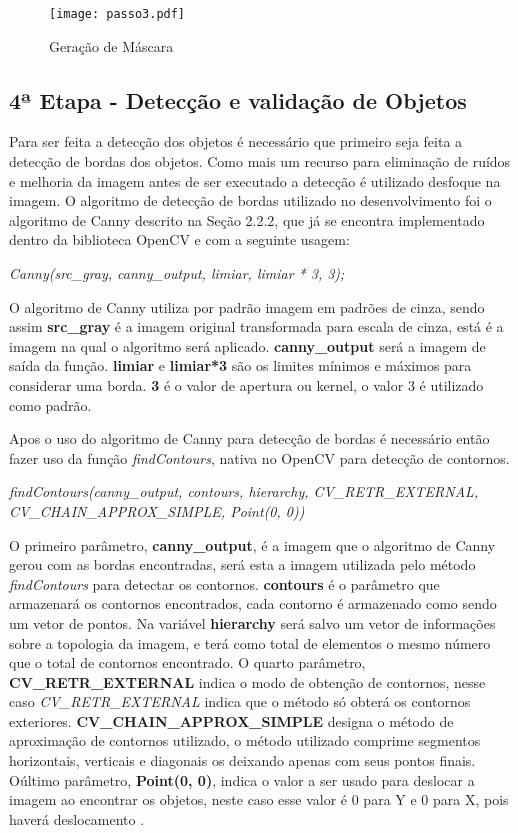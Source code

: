 \begin{figure}[H]
			\centering
			\texttt{[image: passo3.pdf]}
			\caption{Geração de Máscara}
			\label{Configuracao}
		\end{figure}		


\subsection{4ª Etapa - Detecção e validação de Objetos}
Para ser feita a detecção dos objetos é necessário que primeiro seja feita a detecção de bordas dos objetos. Como mais um recurso para eliminação de ruídos e melhoria da imagem antes de ser executado a detecção é utilizado desfoque na imagem. O algoritmo de detecção de bordas utilizado no desenvolvimento foi o algoritmo de Canny descrito na Seção 2.2.2, que já se encontra implementado dentro da biblioteca OpenCV e com a seguinte usagem:
\begin{center}
\centering \textit{  Canny(src\_gray, canny\_output, limiar, limiar * 3, 3);}
\end{center}
O algoritmo de Canny utiliza por padrão imagem em padrões de cinza, sendo assim \textbf{src\_gray} é a imagem original transformada para escala de cinza, está é a imagem na qual o algoritmo será aplicado. \textbf{canny\_output} será a imagem de saída da função.
\textbf{limiar} e \textbf{limiar*3} são os limites mínimos e máximos para considerar uma borda. \textbf{3} é o valor de apertura ou kernel, o valor 3 é utilizado como padrão.

Apos o uso do algoritmo de Canny para detecção de bordas é necessário então fazer uso da função \textit{findContours}, nativa no OpenCV para detecção de contornos.
\begin{center}
\centering \textit{ findContours(canny\_output, contours, hierarchy, CV\_RETR\_EXTERNAL, CV\_CHAIN\_APPROX\_SIMPLE, Point(0, 0))}
\end{center}

O primeiro parâmetro, \textbf{canny\_output}, é a imagem que o algoritmo de Canny gerou com as bordas encontradas, será esta a imagem utilizada pelo método \textit{findContours} para detectar os contornos. \textbf{contours} é o parâmetro que armazenará os contornos encontrados, cada contorno é armazenado como sendo um vetor de pontos. Na variável \textbf{hierarchy} será salvo um vetor de informações sobre a topologia da imagem, e terá como total de elementos o mesmo número que o total de contornos encontrado. O quarto parâmetro, \textbf{CV\_RETR\_EXTERNAL} indica o modo de obtenção de contornos, nesse caso \textit{CV\_RETR\_EXTERNAL} indica que o método só obterá os contornos exteriores. \textbf{CV\_CHAIN\_APPROX\_SIMPLE} designa o método de aproximação de contornos utilizado, o método utilizado comprime segmentos horizontais, verticais e diagonais os deixando apenas com seus pontos finais. Oúltimo parâmetro, \textbf{Point(0, 0)}, indica o valor a ser usado para deslocar a imagem ao encontrar os objetos, neste caso esse valor é 0 para Y e 0 para X, pois haverá deslocamento \cite{OpenCV}. 

